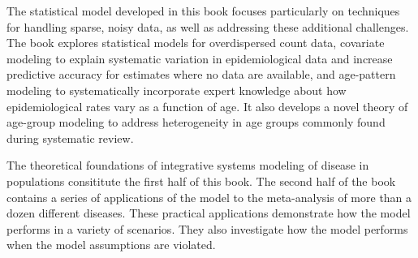 The statistical model developed in this book focuses
particularly on techniques for handling sparse, noisy data, as well as
addressing these additional challenges.  The book explores statistical
models for overdispersed count data, covariate modeling to explain
systematic variation in epidemiological data and increase predictive
accuracy for estimates where no data are available, and age-pattern
modeling to systematically incorporate expert knowledge about how
epidemiological rates vary as a function of age.  It also develops a
novel theory of age-group modeling to address heterogeneity in age
groups commonly found during systematic review.

The theoretical foundations of integrative systems modeling of disease
in populations consititute the first half of this book.  The second
half of the book contains a series of applications of the model to the
meta-analysis of more than a dozen different diseases.  These
practical applications demonstrate how the model performs in a variety
of scenarios. They also investigate how the model performs when the
model assumptions are violated.

